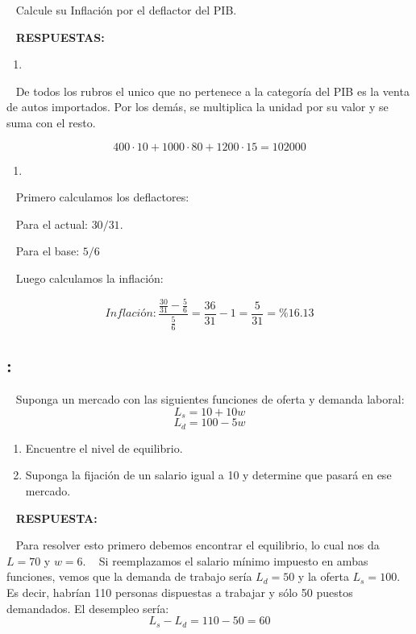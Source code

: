 \documentclass[
  letterpaper,
  DIV=11,
  numbers=noendperiod]{scrreport}
\providecommand{\tightlist}{%
  \setlength{\itemsep}{0pt}\setlength{\parskip}{0pt}}\usepackage{longtable,booktabs,array}
\begin{document}
~ Calcule su Inflación por el deflactor del PIB.

~ \textbf{RESPUESTAS:}

\begin{enumerate}
\def\labelenumi{\alph{enumi})}
\tightlist
\item
\end{enumerate}

~ De todos los rubros el unico que no pertenece a la categoría del PIB
es la venta de autos importados. Por los demás, se multiplica la unidad
por su valor y se suma con el resto.

\[400\cdot10+1000\cdot80+1200\cdot15=102000\]

\begin{enumerate}
\def\labelenumi{\alph{enumi})}
\setcounter{enumi}{1}
\tightlist
\item
\end{enumerate}

~ Primero calculamos los deflactores:

~ Para el actual: \(30/31\).

~ Para el base: \(5/6\)

~ Luego calculamos la inflación:

\[Inflación:\frac{\frac{30}{31}-\frac{5}{6}}{\frac{5}{6}}=\frac{36}{31}-1=\frac{5}{31}=\%16.13\]

\hypertarget{section-22}{%
\subsection{:}\label{section-22}}

~ Suponga un mercado con las siguientes funciones de oferta y demanda
laboral: \[L_s=10+10w\] \[L_d=100-5w\]

\begin{enumerate}
\def\labelenumi{\alph{enumi})}
\item
  Encuentre el nivel de equilibrio.
\item
  Suponga la fijación de un salario igual a 10 y determine que pasará en
  ese mercado.
\end{enumerate}

~ \textbf{RESPUESTA:}

~ Para resolver esto primero debemos encontrar el equilibrio, lo cual
nos da \(L = 70\) y \(w = 6\). ~ Si reemplazamos el salario mínimo
impuesto en ambas funciones, vemos que la demanda de trabajo sería
\(L_d=50\) y la oferta \(L_s=100\). Es decir, habrían 110 personas
dispuestas a trabajar y sólo 50 puestos demandados. El desempleo sería:
\[L_s - L_d = 110 - 50 = 60\]
\end{document}
